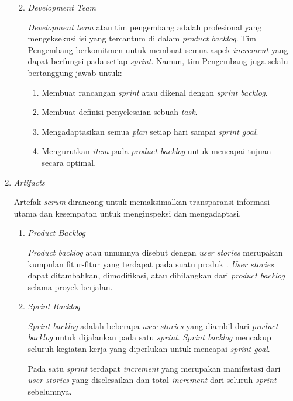 \begin{enumerate}
\begin{enumerate}
\begin{enumerate}
		\end{enumerate}
	
		\item \emph{Development Team}
		
		\emph{Development team} atau tim pengembang adalah profesional yang mengeksekusi isi yang tercantum di dalam \emph{product backlog}. Tim Pengembang berkomitmen untuk membuat semua aspek \emph{increment} yang dapat berfungsi pada setiap \emph{sprint}. Namun, tim Pengembang juga selalu bertanggung jawab untuk:
		
		\begin{enumerate}
			\item Membuat rancangan \emph{sprint} atau dikenal dengan \emph{sprint backlog}.
			\item Membuat definisi penyelesaian sebuah \emph{task}.
			\item Mengadaptasikan semua \emph{plan} setiap hari sampai \emph{sprint goal}.
			\item Mengurutkan \emph{item} pada \emph{product backlog} untuk mencapai tujuan secara optimal.
			
		\end{enumerate}
		
	\end{enumerate}
	
	\item \emph{Artifacts}
	
	Artefak \emph{scrum} dirancang untuk memaksimalkan transparansi informasi utama dan kesempatan untuk menginspeksi dan mengadaptasi.
	
	\begin{enumerate}
		\item \emph{Product Backlog}
		
		\emph{Product backlog} atau umumnya disebut dengan \emph{user stories} merupakan kumpulan fitur-fitur yang terdapat pada suatu produk . \emph{User stories} dapat ditambahkan, dimodifikasi, atau dihilangkan dari \emph{product backlog} selama proyek berjalan.
		
		\item \emph{Sprint Backlog}
		
		\emph{Sprint backlog} adalah beberapa \emph{user stories} yang diambil dari \emph{product backlog} untuk dijalankan pada satu \emph{sprint}. \emph{Sprint backlog} mencakup seluruh kegiatan kerja yang diperlukan untuk mencapai \emph{sprint goal}.
		
		Pada satu \emph{sprint} terdapat \emph{increment} yang merupakan manifestasi dari \emph{user stories} yang diselesaikan dan total \emph{increment} dari seluruh \emph{sprint} sebelumnya.
		

\end{enumerate}
\end{enumerate}
